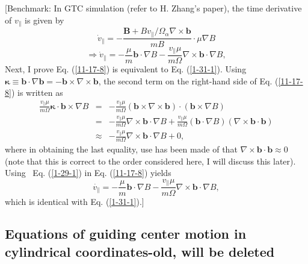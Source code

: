 \documentclass{article}
\begin{document}
[Benchmark: In GTC simulation (refer to H. Zhang's paper{\cite{zhang2010}}),
the time derivative of $v_{\parallel}$ is given by
\begin{equation}
  \dot{v}_{\parallel} = - \frac{\mathbf{B}+ B v_{\parallel} / \Omega_{\alpha}
  \nabla \times \mathbf{b}}{m B} \cdot \mu \nabla B
\end{equation}
\begin{equation}
  \label{1-31-1} \Longrightarrow \dot{v}_{\parallel} = - \frac{\mu}{m}
  \mathbf{b} \cdot \nabla B - \frac{v_{\parallel} \mu}{m \Omega} \nabla \times
  \mathbf{b} \cdot \nabla B,
\end{equation}
Next, I prove Eq. (\ref{11-17-8}) is equivalent to Eq. (\ref{1-31-1}). Using
$\mathbf{\kappa} \equiv \mathbf{b} \cdot \nabla \mathbf{b}= -\mathbf{b} \times
\nabla \times \mathbf{b}$, the second term on the right-hand side of Eq.
(\ref{11-17-8}) is written as
\begin{eqnarray}
  \frac{v_{\parallel} \mu}{m \Omega} \mathbf{\kappa} \cdot \mathbf{b} \times
  \nabla B & = & - \frac{v_{\parallel} \mu}{m \Omega} (\mathbf{b} \times
  \nabla \times \mathbf{b}) \cdot (\mathbf{b} \times \nabla B) \nonumber\\
  & = & - \frac{v_{\parallel} \mu}{m \Omega} \nabla \times \mathbf{b} \cdot
  \nabla B + \frac{v_{\parallel} \mu}{m \Omega} (\mathbf{b} \cdot \nabla B)
  (\nabla \times \mathbf{b} \cdot \mathbf{b}) \nonumber\\
  & \approx & - \frac{v_{\parallel} \mu}{m \Omega} \nabla \times \mathbf{b}
  \cdot \nabla B + 0,  \label{1-29-1}
\end{eqnarray}
where in obtaining the last equality, use has been made of that $\nabla \times
\mathbf{b} \cdot \mathbf{b} \approx 0$ (note that this is correct to the order
considered here, I will discuss this later). Using \ Eq. (\ref{1-29-1}) in Eq.
(\ref{11-17-8}) yields
\begin{equation}
  \label{1-28-1} \dot{v_{\parallel}} = - \frac{\mu}{m} \mathbf{b} \cdot \nabla
  B - \frac{v_{\parallel} \mu}{m \Omega} \nabla \times \mathbf{b} \cdot \nabla
  B,
\end{equation}
which is identical with Eq. (\ref{1-31-1}).]

\subsection{Equations of guiding center motion in cylindrical coordinates-old,
will be deleted}
\end{document}
